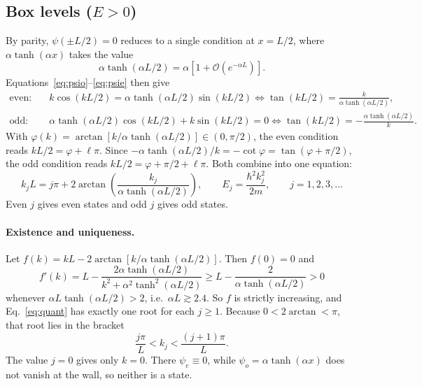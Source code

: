 \documentclass[11pt]{article}
\numberwithin{equation}{section}
\begin{document}
\subsection{Box levels (\texorpdfstring{$E>0$}{E > 0})}
By parity, $\psi(\pm L/2)=0$ reduces to a single condition at $x=L/2$, where $\alpha\tanh(\alpha x)$ takes the value
\begin{equation}
\alpha\tanh(\alpha L/2)=\alpha\left[1+\mathcal O(e^{-\alpha L})\right].
\end{equation}
Equations~\eqref{eq:psio}--\eqref{eq:psie} then give
\begin{align}
\text{even:}\quad& k\cos(kL/2)=\alpha\tanh(\alpha L/2)\sin(kL/2)\iff \tan(kL/2)=\frac{k}{\alpha\tanh(\alpha L/2)},\\
\text{odd:}\quad& \alpha\tanh(\alpha L/2)\cos(kL/2)+k\sin(kL/2)=0\iff \tan(kL/2)=-\frac{\alpha\tanh(\alpha L/2)}{k} .
\end{align}
With $\varphi(k)=\arctan[k/\alpha\tanh(\alpha L/2)]\in(0,\pi/2)$, the even condition reads $kL/2=\varphi+\ell\pi$. Since $-\alpha\tanh(\alpha L/2)/k=-\cot\varphi=\tan(\varphi+\pi/2)$, the odd condition reads $kL/2=\varphi+\pi/2+\ell\pi$. Both combine into one equation:
\begin{equation}
\boxed{\;k_jL=j\pi+2\arctan\!\left(\frac{k_j}{\alpha\tanh(\alpha L/2)}\right),\qquad E_j=\frac{\hbar^2k_j^2}{2m},\qquad j=1,2,3,\dots\;}
\label{eq:quant}
\end{equation}
Even $j$ gives even states and odd $j$ gives odd states.

\paragraph{Existence and uniqueness.} Let $f(k)=kL-2\arctan[k/\alpha\tanh(\alpha L/2)]$. Then $f(0)=0$ and
\[
f'(k)=L-\frac{2\alpha\tanh(\alpha L/2)}{k^2+\alpha^2\tanh^2(\alpha L/2)}\ge L-\frac{2}{\alpha\tanh(\alpha L/2)}>0
\]
whenever $\alpha L\tanh(\alpha L/2)>2$, i.e.\ $\alpha L\gtrsim2.4$. So $f$ is strictly increasing, and Eq.~\eqref{eq:quant} has exactly one root for each $j\ge1$. Because $0<2\arctan<\pi$, that root lies in the bracket
\begin{equation}
\frac{j\pi}{L}<k_j<\frac{(j+1)\pi}{L}.
\label{eq:bracket}
\end{equation}
The value $j=0$ gives only $k=0$. There $\psi_e\equiv0$, while $\psi_o=\alpha\tanh(\alpha x)$ does not vanish at the wall, so neither is a state.
\end{document}
